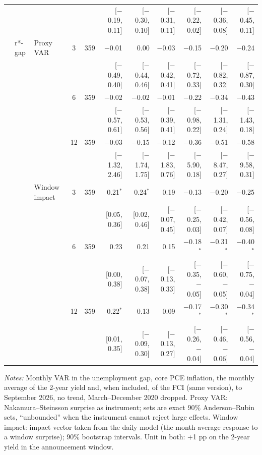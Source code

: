 \begin{longtable}{lllcrrrrrrr}
 & & & & & {\tiny [$-$0.19, 0.11]} & {\tiny [$-$0.30, 0.10]} & {\tiny [$-$0.31, 0.11]} & {\tiny [$-$0.22, 0.02]} & {\tiny [$-$0.36, 0.08]} & {\tiny [$-$0.45, 0.11]}\\
 & r*-gap & Proxy VAR & 3 & 359 & $-$0.01 & 0.00 & $-$0.03 & $-$0.15 & $-$0.20 & $-$0.24\\
 & & & & & {\tiny [$-$0.49, 0.40]} & {\tiny [$-$0.44, 0.46]} & {\tiny [$-$0.42, 0.41]} & {\tiny [$-$0.72, 0.33]} & {\tiny [$-$0.82, 0.32]} & {\tiny [$-$0.87, 0.30]}\\
 &  &  & 6 & 359 & $-$0.02 & $-$0.02 & $-$0.01 & $-$0.22 & $-$0.34 & $-$0.43\\
 & & & & & {\tiny [$-$0.57, 0.61]} & {\tiny [$-$0.53, 0.56]} & {\tiny [$-$0.39, 0.41]} & {\tiny [$-$0.98, 0.22]} & {\tiny [$-$1.31, 0.24]} & {\tiny [$-$1.43, 0.18]}\\
 &  &  & 12 & 359 & $-$0.03 & $-$0.15 & $-$0.12 & $-$0.36 & $-$0.51 & $-$0.58\\
 & & & & & {\tiny [$-$1.32, 2.46]} & {\tiny [$-$1.74, 1.75]} & {\tiny [$-$1.83, 0.76]} & {\tiny [$-$5.90, 0.18]} & {\tiny [$-$8.47, 0.27]} & {\tiny [$-$9.58, 0.31]}\\
 &  & Window impact & 3 & 359 & 0.21$^{*}$ & 0.24$^{*}$ & 0.19 & $-$0.13 & $-$0.20 & $-$0.25\\
 & & & & & {\tiny [0.05, 0.36]} & {\tiny [0.02, 0.46]} & {\tiny [$-$0.07, 0.45]} & {\tiny [$-$0.25, 0.03]} & {\tiny [$-$0.42, 0.07]} & {\tiny [$-$0.56, 0.08]}\\
 &  &  & 6 & 359 & 0.23 & 0.21 & 0.15 & $-$0.18$^{*}$ & $-$0.31$^{*}$ & $-$0.40$^{*}$\\
 & & & & & {\tiny [0.00, 0.38]} & {\tiny [$-$0.07, 0.38]} & {\tiny [$-$0.13, 0.33]} & {\tiny [$-$0.35, $-$0.05]} & {\tiny [$-$0.60, $-$0.05]} & {\tiny [$-$0.75, $-$0.04]}\\
 &  &  & 12 & 359 & 0.22$^{*}$ & 0.13 & 0.09 & $-$0.17$^{*}$ & $-$0.30$^{*}$ & $-$0.34$^{*}$\\
 & & & & & {\tiny [0.01, 0.35]} & {\tiny [$-$0.09, 0.30]} & {\tiny [$-$0.13, 0.27]} & {\tiny [$-$0.26, $-$0.04]} & {\tiny [$-$0.46, $-$0.06]} & {\tiny [$-$0.56, $-$0.04]}\\
\end{longtable}
\begin{flushleft}\footnotesize\textit{Notes:} Monthly VAR in the unemployment gap, core PCE inflation, the monthly average of the 2-year yield and, when included, of the FCI (same version), to September 2026, no trend, March--December 2020 dropped. Proxy VAR: Nakamura--Steinsson surprise as instrument; sets are exact 90\% Anderson--Rubin sets, ``unbounded'' when the instrument cannot reject large effects. Window impact: impact vector taken from the daily model (the month-average response to a window surprise); 90\% bootstrap intervals. Unit in both: +1 pp on the 2-year yield in the announcement window.\end{flushleft}
\endgroup
